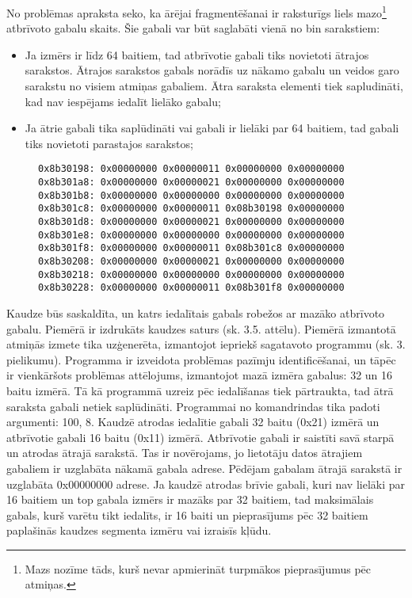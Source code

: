 No problēmas apraksta seko, ka ārējai fragmentēšanai ir raksturīgs liels mazo\footnote{Mazs nozīme tāds, kurš nevar apmierināt turpmākos pieprasījumus pēc atmiņas.} atbrīvoto gabalu skaits.
Šie gabali var būt saglabāti vienā no bin sarakstiem:
\begin{itemize}
\item Ja izmērs ir līdz 64 baitiem, tad atbrīvotie gabali tiks novietoti ātrajos sarakstos.
Ātrajos sarakstos gabals norādīs uz nākamo gabalu un veidos garo sarakstu no visiem atmiņas gabaliem.
Ātra saraksta elementi tiek sapludināti, kad nav iespējams iedalīt lielāko gabalu;
\item Ja ātrie gabali tika saplūdināti vai gabali ir lielāki par 64 baitiem, tad gabali tiks novietoti parastajos sarakstos;
\end{itemize}
\begin{figure}[h]
\begin{lstlisting}[style=customgdb]
0x8b30198: 0x00000000 0x00000011 0x00000000 0x00000000
0x8b301a8: 0x00000000 0x00000021 0x00000000 0x00000000
0x8b301b8: 0x00000000 0x00000000 0x00000000 0x00000000
0x8b301c8: 0x00000000 0x00000011 0x08b30198 0x00000000
0x8b301d8: 0x00000000 0x00000021 0x00000000 0x00000000
0x8b301e8: 0x00000000 0x00000000 0x00000000 0x00000000
0x8b301f8: 0x00000000 0x00000011 0x08b301c8 0x00000000
0x8b30208: 0x00000000 0x00000021 0x00000000 0x00000000
0x8b30218: 0x00000000 0x00000000 0x00000000 0x00000000
0x8b30228: 0x00000000 0x00000011 0x08b301f8 0x00000000
\end{lstlisting}
\caption{\textbf{\fontsize{11}{12}\selectfont {Fragmentētā kaudze}}}
\end{figure}

Kaudze būs saskaldīta, un katrs iedalītais gabals robežos ar mazāko atbrīvoto gabalu.
Piemērā ir izdrukāts kaudzes saturs (sk. 3.5. attēlu).
Piemērā izmantotā atmiņās izmete tika uzģenerēta, izmantojot iepriekš sagatavoto programmu (sk. 3. pielikumu).
Programma ir izveidota problēmas pazīmju identificēšanai, un tāpēc ir vienkāršots problēmas attēlojums, izmantojot mazā izmēra gabalus: 32 un 16 baitu izmērā.
Tā kā programmā uzreiz pēc iedalīšanas tiek pārtraukta, tad ātrā saraksta gabali netiek saplūdināti.
Programmai no komandrindas tika padoti argumenti: 100, 8.
Kaudzē atrodas iedalītie gabali 32 baitu (0x21) izmērā un atbrīvotie gabali 16 baitu (0x11) izmērā.
Atbrīvotie gabali ir saistīti savā starpā un atrodas ātrajā sarakstā.
Tas ir novērojams, jo lietotāju datos ātrajiem gabaliem ir uzglabāta nākamā gabala adrese.
Pēdējam gabalam ātrajā sarakstā ir uzglabāta 0x00000000 adrese.
Ja kaudzē atrodas brīvie gabali, kuri nav lielāki par 16 baitiem un top gabala izmērs ir mazāks par 32 baitiem, tad maksimālais gabals, kurš varētu tikt iedalīts, ir 16 baiti un pieprasījums pēc 32 baitiem paplašinās kaudzes segmenta izmēru vai izraisīs kļūdu.

